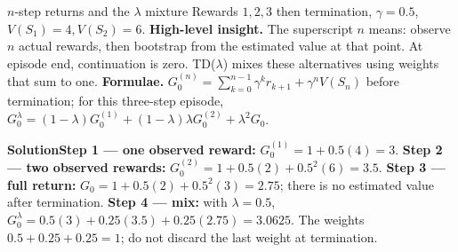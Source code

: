 \documentclass[10pt,a4paper]{article}
\newcommand{\ans}{\par\smallskip\textbf{\color{good}Solution\quad}}
\begin{document}
\begin{question}{$n$-step returns and the $\lambda$ mixture}
Rewards $1,2,3$ then termination, $\gamma=0.5$, $V(S_1)=4,V(S_2)=6$.
\textbf{High-level insight.} The superscript $n$ means: observe $n$ actual rewards, then bootstrap from the estimated value at that point. At episode end, continuation is zero. TD($\lambda$) mixes these alternatives using weights that sum to one.
\textbf{Formulae.} $G_0^{(n)}=\sum_{k=0}^{n-1}\gamma^kr_{k+1}+\gamma^nV(S_n)$ before termination; for this three-step episode, $G_0^\lambda=(1-\lambda)G_0^{(1)}+(1-\lambda)\lambda G_0^{(2)}+\lambda^2G_0$.
\ans \textbf{Step 1 --- one observed reward:} $G_0^{(1)}=1+0.5(4)=3$.
\textbf{Step 2 --- two observed rewards:} $G_0^{(2)}=1+0.5(2)+0.5^2(6)=3.5$.
\textbf{Step 3 --- full return:} $G_0=1+0.5(2)+0.5^2(3)=2.75$; there is no estimated value after termination.
\textbf{Step 4 --- mix:} with $\lambda=0.5$, $G_0^\lambda=0.5(3)+0.25(3.5)+0.25(2.75)=\boxed{3.0625}$. The weights $0.5+0.25+0.25=1$; do not discard the last weight at termination.
\end{question}
\end{document}
